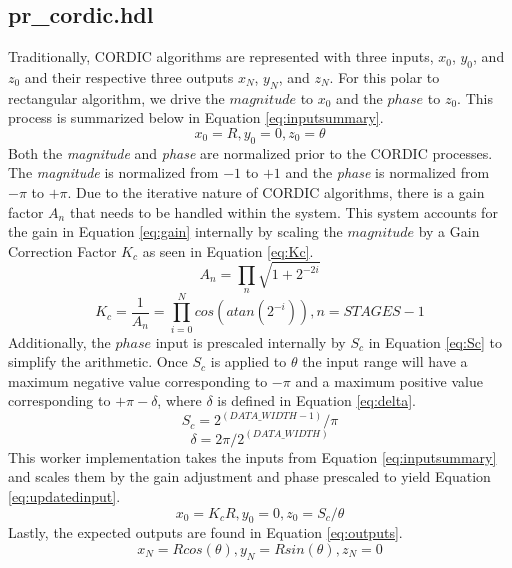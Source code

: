 \documentclass{article}
\def\comp{pr\_cordic}
\begin{document}
\subsection*{\comp.hdl}
Traditionally, CORDIC algorithms are represented with three inputs, $x_0$, $y_0$, and $z_0$	and their respective three outputs $x_N$, $y_N$, and $z_N$. For this polar to rectangular algorithm, we drive the $magnitude$ to $x_0$ and the $phase$ to $z_0$. This process is summarized below in Equation \ref{eq:inputsummary}.
\begin{equation} \label{eq:inputsummary}
	x_{0}=R, y_{0}=0, z_{0}=\theta
\end{equation}
Both the \textit{magnitude} and \textit{phase} are normalized prior to the CORDIC processes. The  \textit{magnitude} is normalized from $-1$ to $+1$ and the \textit{phase} is normalized from $-\pi$ to $+\pi$. Due to the iterative nature of CORDIC algorithms, there is a gain factor $A_{n}$ that needs to be handled within the system. This system accounts for the gain in Equation \ref{eq:gain} internally by scaling the $magnitude$ by a Gain Correction Factor $K_c$ as seen in Equation \ref{eq:Kc}.
\begin{equation} \label{eq:gain}
	A_{n}=\prod_{n}\sqrt{1+2^{-2i}}
\end{equation}
\begin{equation}  \label{eq:Kc}
	K_{c}=\dfrac{1}{A_n}=\prod_{i=0}^Ncos(atan(2^{-i})), n=STAGES-1
\end{equation}
Additionally, the $phase$ input is prescaled internally by $S_c$ in Equation \ref{eq:Sc} to simplify the arithmetic. Once $S_c$ is applied to $\theta$ the input range will have a maximum negative value corresponding to $-\pi$ and a maximum positive value corresponding to $+\pi-\delta$, where $\delta$ is defined in Equation \ref{eq:delta}.
\begin{equation}  \label{eq:Sc}
	S_{c}=2^{(DATA\_WIDTH-1)}/\pi
\end{equation}
\begin{equation} \label{eq:delta}
	\delta = 2\pi/2^{(DATA\_WIDTH)}
\end{equation}
This worker implementation takes the inputs from Equation \ref{eq:inputsummary} and scales them by the gain adjustment and phase prescaled to yield Equation \ref{eq:updatedinput}.
\begin{equation} \label{eq:updatedinput}
	x_{0}=K_{c}R, y_{0}=0, z_{0}= S_{c}/ \theta
\end{equation}
Lastly, the expected outputs are found in Equation \ref{eq:outputs}.
\begin{equation} \label{eq:outputs}
	x_{N}=Rcos(\theta), y_{N}=Rsin(\theta), z_{N}=0
\end{equation}
\end{document}
